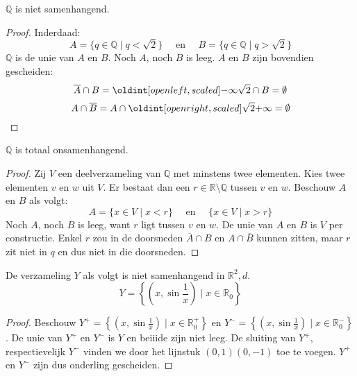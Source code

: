 \documentclass[main.tex]{subfiles}
\begin{document}
\begin{vb}
  $\mathbb{Q}$ is niet samenhangend.

  \begin{proof}
    Inderdaad:
    \[ A = \{ q\in \mathbb{Q} \mid q < \sqrt{2} \} \quad\text{ en }\quad B = \{ q \in \mathbb{Q} \mid q > \sqrt{2} \} \]
    $\mathbb{Q}$ is de unie van $A$ en $B$.
    Noch $A$, noch $B$ is leeg.
    $A$ en $B$ zijn bovendien gescheiden:
    \[ \overline{A} \cap B = \interval[open left]{-\infty}{\sqrt{2}} \cap B = \emptyset \]
    \[ A \cap \overline{B} = A \cap \interval[open right]{\sqrt{2}}{+\infty} = \emptyset \]
  \end{proof}
\end{vb}

\begin{vb}
  $\mathbb{Q}$ is totaal onsamenhangend.

  \begin{proof}
    Zij $V$ een deelverzameling van $\mathbb{Q}$ met minstens twee elementen.
    Kies twee elementen $v$ en $w$ uit $V$.
    Er bestaat dan een $r\in \mathbb{R} \setminus \mathbb{Q}$ tussen $v$ en $w$.\needed
    Beschouw $A$ en $B$ als volgt:
    \[ A = \{ x \in V \mid x < r \} \quad\text{ en }\quad \{ x \in V \mid x > r \} \]
    Noch $A$, noch $B$ is leeg, want $r$ ligt tussen $v$ en $w$.
    De unie van $A$ en $B$ is $V$ per constructie.
    Enkel $r$ zou in de doorsneden $\overline{A} \cap B$ en $A \cap \overline{B}$ kunnen zitten, maar $r$ zit niet in $q$ en dus niet in die doorsneden.
  \end{proof}
\end{vb}

\begin{vb}
  De verzameling $Y$ als volgt is niet samenhangend in $\mathbb{R}^{2},d$.
  \[ Y = \left\{ \left(x, \sin\frac{1}{x}\right) \mid x \in \mathbb{R}_{0} \right\} \]

  \begin{proof}
    Beschouw $Y^{+} = \left\{ \left(x, \sin\frac{1}{x}\right) \mid x \in \mathbb{R}_{0}^{+} \right\}$ en $Y^{-} = \left\{ \left(x, \sin\frac{1}{x}\right) \mid x \in \mathbb{R}_{0}^{-} \right\}$.
    De unie van $Y^{+}$ en $Y^{-}$ is $Y$ en beiiide zijn niet leeg.
    De sluiting van $Y^{+}$, respectievelijk $Y^{-}$ vinden we door het lijnstuk $(0,1)(0,-1)$ toe te voegen.\waarom
    $Y^{+}$ en $Y^{-}$ zijn dus onderling gescheiden.
  \end{proof}
\end{vb}
\end{document}

